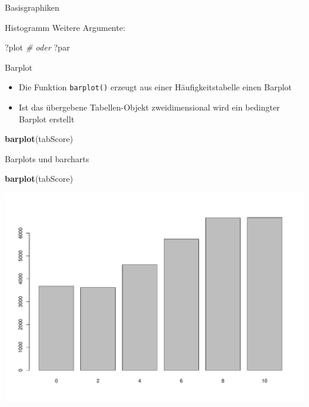 \documentclass[ignorenonframetext,]{beamer}
\newenvironment{Shaded}{}{}
\newcommand{\KeywordTok}[1]{\textcolor[rgb]{0.00,0.44,0.13}{\textbf{{#1}}}}
\newcommand{\StringTok}[1]{\textcolor[rgb]{0.25,0.44,0.63}{{#1}}}
\newcommand{\CommentTok}[1]{\textcolor[rgb]{0.38,0.63,0.69}{\textit{{#1}}}}
\newcommand{\NormalTok}[1]{{#1}}
\providecommand{\tightlist}{%
\setlength{\itemsep}{0pt}\setlength{\parskip}{0pt}}
\begin{document}
\begin{frame}[fragile]{Basisgraphiken}
\begin{block}{Histogramm}
Weitere Argumente:

\begin{Shaded}
\begin{Highlighting}[]
\NormalTok{?plot}
\CommentTok{# oder}
\NormalTok{?par}
\end{Highlighting}
\end{Shaded}

\end{block}

\begin{block}{Barplot}

\begin{itemize}
\tightlist
\item
  Die Funktion \texttt{barplot()} erzeugt aus einer Häufigkeitstabelle
  einen Barplot
\item
  Ist das übergebene Tabellen-Objekt zweidimensional wird ein bedingter
  Barplot erstellt
\end{itemize}

\begin{Shaded}
\end{Shaded}

\begin{Shaded}
\begin{Highlighting}[]
\KeywordTok{barplot}\NormalTok{(tabScore)}
\end{Highlighting}
\end{Shaded}

\end{block}

\begin{block}{Barplots und barcharts}

\begin{Shaded}
\begin{Highlighting}[]
\KeywordTok{barplot}\NormalTok{(tabScore)}
\end{Highlighting}
\end{Shaded}

\includegraphics{R_intern_files/figure-beamer/unnamed-chunk-155-1.pdf}


\end{block}
\end{frame}
\end{document}

